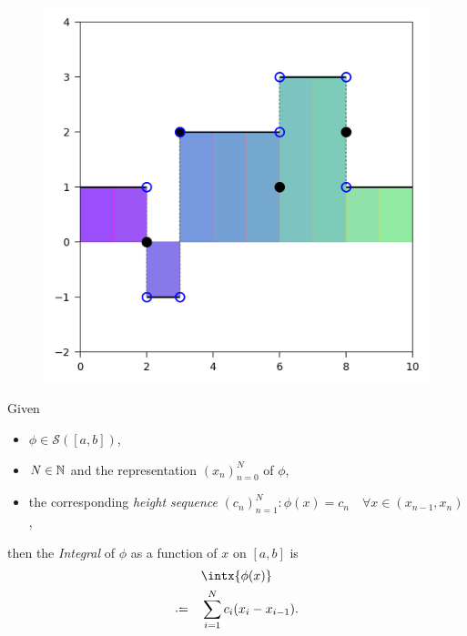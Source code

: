 \begin{figure}[h]
  \centering
  \includegraphics{Code/StepFilled2.png}
  \label{fig:stepfilled}
\end{figure}

\begin{definition}
\label{def:stepint}
	Given
	\begin{itemize}
	\item 
		$\phi \in \mathcal{S}([a, b])$,
	\item
		$N \in \mathbb{N}$ and the representation $(x_n)_{n=0}^N$ of $\phi$,
	\item
		the corresponding \emph{height sequence} $(c_n)_{n=1}^N : \phi(x) = c_n \quad \forall x \in (x_{n-1}, x_{n})$,
	\end{itemize}
	then the \emph{Integral} of $\phi$ as a function of $x$ on $[a, b]$ is
	\begin{equation}
	\begin{split}
		&\intx{\phi(x)} \\
		\defeq \quad &\sum_{i=1}^N c_i(x_{i} - x_{i-1}).
	\end{split}
	\end{equation}
\end{definition}%

